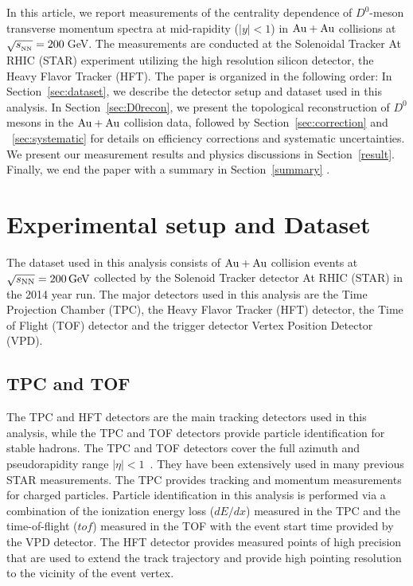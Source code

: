 \documentclass[%
 reprint,	
 amsmath,amssymb,
 aps,
 prc,
]{revtex4-1}
\begin{document}
In this article, we report measurements of the centrality dependence of $D^0$-meson transverse momentum spectra at mid-rapidity ($|y|<1$) in ${\rm{Au + Au}}$ collisions at $\sqrt{s_{_{\rm NN}}} = 200$\,GeV. The measurements are conducted at the Solenoidal Tracker At RHIC (STAR) experiment utilizing the high resolution silicon detector, the Heavy Flavor Tracker (HFT). The paper is organized in the following order: In Section~\ref{sec:dataset}, we describe the detector setup and dataset used in this analysis. In Section~\ref{sec:D0recon}, we present the topological reconstruction of $D^0$ mesons in the ${\rm{Au + Au}}$ collision data, followed by Section~\ref{sec:correction} and ~\ref{sec:systematic} for details on efficiency corrections and systematic uncertainties. We present our measurement results and physics discussions in Section~\ref{result}. Finally, we end the paper with a summary in Section~\ref{summary} .

\section{\label{sec:dataset}Experimental setup and Dataset}
The dataset used in this analysis consists of ${\rm{Au + Au}}$ collision events at ${\sqrt{s_{\rm NN}} = \rm{200\,GeV}}$ collected by the Solenoid Tracker detector At RHIC (STAR) in the 2014 year run. The major detectors used in this analysis are the Time Projection Chamber (TPC), the Heavy Flavor Tracker (HFT) detector, the Time of Flight (TOF) detector and the trigger detector Vertex Position Detector (VPD). 

\subsection{\label{sec:dataset:tpctof}TPC and TOF}
The TPC and HFT detectors are the main tracking detectors used in this analysis, while the TPC and TOF detectors provide particle identification for stable hadrons. The TPC and TOF detectors cover the full azimuth and pseudorapidity range $|\eta|<1$~\cite{TPC,TOF}. They have been extensively used in many previous STAR measurements. The TPC provides tracking and momentum measurements for charged particles. Particle identification in this analysis is performed via a combination of the ionization energy loss ($dE/dx$) measured in the TPC and the time-of-flight ($tof$) measured in the TOF with the event start time provided by the VPD detector. The HFT detector provides measured points of high precision that are used to extend the track trajectory and provide high pointing resolution to the vicinity of the event vertex.
\end{document}
